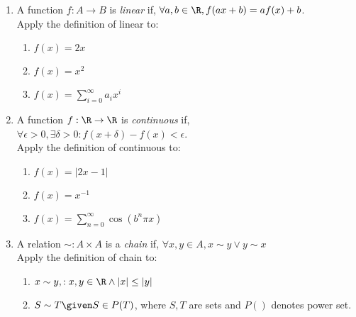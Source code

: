 \documentclass[basic, header]{nosvagor-notes}
\begin{document}
\begin{enumerate}[itemsep=5em]

  \item A function \(f : A \to B \) is \textit{linear} if, \(\forall a,b \in
    \R, f(ax + b) = a f(x) + b\). \\
    Apply the definition of linear to:
    \begin{enumerate}[itemsep=4em]

      \item \(f(x) = 2x\)

      \item \(f(x) = x^2\)

      \item \(\displaystyle f(x) = \sum_{i=0}^{\infty} a_i x^i \)

    \end{enumerate}

  \item A function \(f : \R \to \R \) is \textit{continuous} if, \(\forall
    \epsilon > 0, \exists \delta > 0 : f(x+\delta) - f(x) < \epsilon\).\\
    Apply the definition of continuous to:
    \begin{enumerate}[itemsep=4em]

      \item \(f(x) = |2x - 1|\)

      \item \(f(x) = x^{-1}\)

      \item \(\displaystyle f(x) = \sum_{n=0}^{\infty} \cos(b^n \pi x)\)

    \end{enumerate}

  \newpage %

  \item A relation \(\sim : A \times A \) is a \textit{chain} if, \(\forall x,y \in A,
    x\sim y \lor y \sim x\) \\
    Apply the definition of chain to:

    \begin{enumerate}[itemsep=4em]

      \item \(x \sim y, : x,y \in \R \land |x| \leq |y|\)

      \item \(S\sim T \given S \in P(T)\), where \(S,T\) are sets and \(P()\)
        denotes power set.


\end{enumerate}
\end{enumerate}
\end{document}
